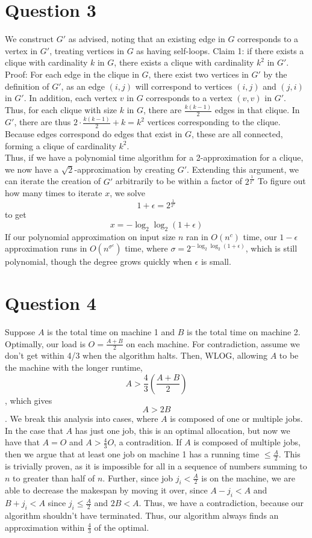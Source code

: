 \documentclass[12pt]{article}
\begin{document}
\section*{Question 3}
We construct $G'$ as advised, noting that an existing edge in $G$ corresponds to a vertex in $G'$, treating vertices in $G$ as having self-loops. Claim 1: if there exists a clique with cardinality $k$ in $G$, there exists a clique with cardinality $k^2$ in $G'$.\\
Proof: For each edge in the clique in $G$, there exist two vertices in $G'$ by the definition of $G'$, as an edge $(i,j)$ will correspond to vertices $(i,j)$ and $(j,i)$ in $G'$. In addition, each vertex $v$ in $G$ corresponds to a vertex $(v,v)$ in $G'$. Thus, for each clique with size $k$ in $G$, there are $\frac{k(k-1)}{2}$ edges in that clique. In $G'$, there are thus $2 \cdot \frac{k(k-1)}{2} + k = k^2$ vertices corresponding to the clique. Because edges correspond do edges that exist in $G$, these are all connected, forming a clique of cardinality $k^2$.\\
Thus, if we have a polynomial time algorithm for a 2-approximation for a clique, we now have a $\sqrt{2}$-approximation by creating $G'$. Extending this argument, we can iterate the creation of $G'$ arbitrarily to be within a factor of $2^{\frac{1}{2^n}}$ To figure out how many times to iterate $x$, we solve $$1+\epsilon = 2^{\frac{1}{2^x}}$$ to get $$x = -\log_2 \log_2(1+\epsilon)$$
If our polynomial approximation on input size $n$ ran in $O(n^c)$ time, our $1-\epsilon$ approximation runs in $O(n^{\sigma^c})$ time, where $\sigma = 2^{-\log_2 \log_2(1+\epsilon)}$, which is still polynomial, though the degree grows quickly when $\epsilon$ is small.

\section*{Question 4}
Suppose $A$ is the total time on machine 1 and $B$ is the total time on machine 2. Optimally, our load is $O = \frac{A+B}{2}$ on each machine. For contradiction, assume we don't get within 4/3 when the algorithm halts. Then, WLOG, allowing $A$ to be the machine with the longer runtime, $$A > \frac{4}{3} (\frac{A+B} {2})$$, which gives $$A > 2B$$. We break this analysis into cases, where $A$ is composed of one or multiple jobs. In the case that $A$ has just one job, this is an optimal allocation, but now we have that $A=O$ and $A > \frac{4}{3} O$, a contradition. If $A$ is composed of multiple jobs, then we argue that at least one job on machine 1 has a running time $\leq \frac{A}{2}$. This is trivially proven, as it is impossible for all in a sequence of numbers summing to $n$ to greater than half of $n$. Further, since job $j_i < \frac{A}{2}$ is on the machine, we are able to decrease the makespan by moving it over, since $A-j_i < A$ and $B + j_i < A$ since $j_i \leq \frac{A}{2}$ and $2B < A$. Thus, we have a contradiction, because our algorithm shouldn't have terminated. Thus, our algorithm always finds an approximation within $\frac{4}{3}$ of the optimal.
\end{document}
